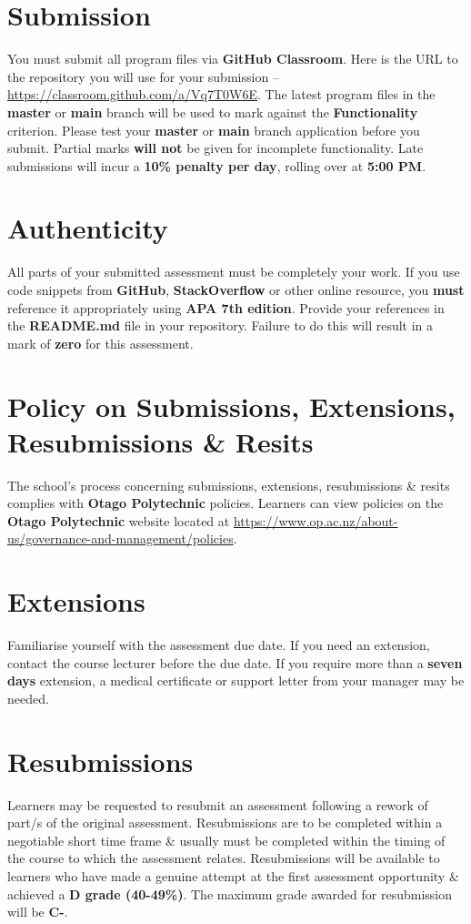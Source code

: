 \documentclass{article}
\begin{document}
\section*{Submission}
You must submit all program files via \textbf{GitHub Classroom}. Here is the URL to the repository you will use for your submission – \href{https://classroom.github.com/a/Vq7T0W6E}{https://classroom.github.com/a/Vq7T0W6E}. The latest program files in the \textbf{master} or \textbf{main} branch will be used to mark against the \textbf{Functionality} criterion. Please test your \textbf{master} or \textbf{main} branch application before you submit. Partial marks \textbf{will not} be given for incomplete functionality. Late submissions will incur a \textbf{10\% penalty per day}, rolling over at \textbf{5:00 PM}.

\section*{Authenticity}
All parts of your submitted assessment must be completely your work. If you use code snippets from \textbf{GitHub}, \textbf{StackOverflow} or other online resource, you \textbf{must} reference it appropriately using \textbf{APA 7th edition}. Provide your references in the \textbf{README.md} file in your repository. Failure to do this will result in a mark of \textbf{zero} for this assessment.

\section*{Policy on Submissions, Extensions, Resubmissions \& Resits}
The school's process concerning submissions, extensions, resubmissions \& resits complies with \textbf{Otago Polytechnic} policies. Learners can view policies on the \textbf{Otago Polytechnic} website located at \href{https://www.op.ac.nz/about-us/governance-and-management/policies}{https://www.op.ac.nz/about-us/governance-and-management/policies}.

\section*{Extensions}
Familiarise yourself with the assessment due date. If you need an extension, contact the course lecturer before the due date. If you require more than a \textbf{seven days} extension, a medical certificate or support letter from your manager may be needed.

\section*{Resubmissions}
Learners may be requested to resubmit an assessment following a rework of part/s of the original assessment. Resubmissions are to be completed within a negotiable short time frame \& usually must be completed within the timing of the course to which the assessment relates. Resubmissions will be available to learners who have made a genuine attempt at the first assessment opportunity \& achieved a \textbf{D grade (40-49\%)}. The maximum grade awarded for resubmission will be \textbf{C-}.
\end{document}

